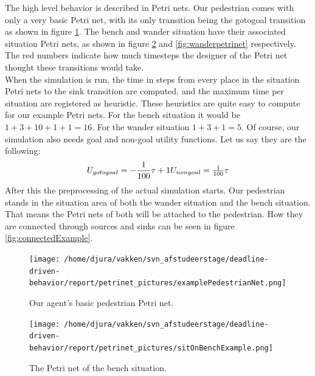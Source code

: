 \documentclass[11pt, a4paper]{book}
\begin{document}
The high level behavior is described in Petri nets. Our pedestrian comes with only a very basic Petri net, with its only transition being the gotogoal transition as shown in figure \ref{fig:exampleAgentnet}. The bench and wander situation have their associated situation Petri nets, as shown in figure \ref{fig:benchSituationNet} and \ref{fig:wanderpetrinet} respectively. 
The red numbers indicate how much timesteps the designer of the Petri net thought these transitions would take.\\
When the simulation is run, the time in steps from every place in the situation Petri nets to the sink transition are computed, and the maximum time per situation are registered as heuristic. These heuristics are quite easy to compute for our example Petri nets. For the bench situation it would be $1+3+10+1+1 = 16$. For the wander situation $1+3+1=5$. Of course, our simulation also needs goal and non-goal utility functions. Let us say they are the following:
\begin{equation}
U_{gotogoal}=-\frac{1}{100}\tau + 1 $$\\$$
U_{nongoal}=\frac{1}{100} \tau 
\end{equation}
After this the preprocessing of the actual simulation starts. Our pedestrian stands in the situation area of both the wander situation and the bench situation. That means the Petri nets of both will be attached to the pedestrian. How they are connected through sources and sinks can be seen in figure \ref{fig:connectedExample}.



\begin{figure}[h!]
\centering            
\texttt{[image: /home/djura/vakken/svn\_afstudeerstage/deadline-driven-behavior/report/petrinet\_pictures/examplePedestrianNet.png]}
\caption{Our agent's basic pedestrian Petri net.}
\label{fig:exampleAgentnet}
\end{figure} 
\begin{figure}[h!]
\centering            
\texttt{[image: /home/djura/vakken/svn\_afstudeerstage/deadline-driven-behavior/report/petrinet\_pictures/sitOnBenchExample.png]}
\caption{The Petri net of the bench situation.}
\label{fig:benchSituationNet}
\end{figure} 
\end{document}
